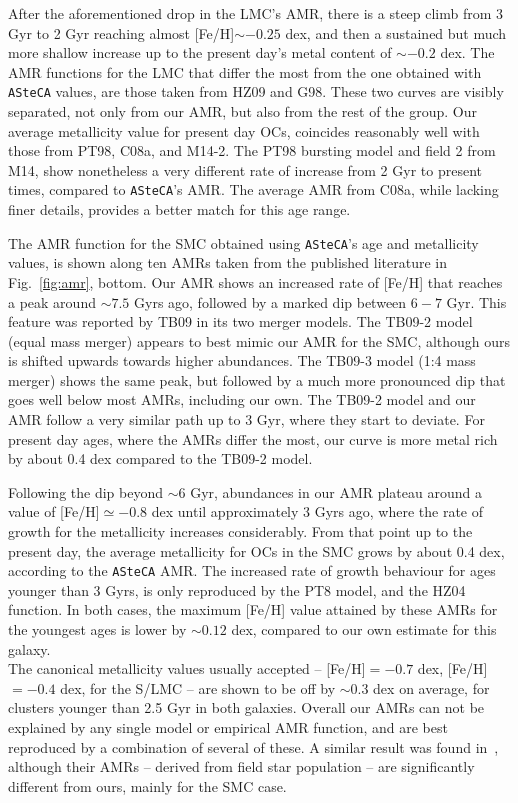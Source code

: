 \documentclass[a4paper,fleqn,usenatbib]{mnras}
\begin{document}
%
After the aforementioned drop in the LMC's AMR, there is a steep climb from 3
Gyr to 2 Gyr reaching almost [Fe/H]${\sim-}0.25$ dex, and then a sustained but
much more shallow increase up to the present day's metal content of ${\sim-}0.2$
dex. The AMR functions for the LMC that differ the most from the one obtained
with \texttt{ASteCA} values, are those taken from HZ09 and G98. These two curves
are visibly separated, not only from our AMR, but also from the rest of the
group.
Our average metallicity value for present day OCs, coincides reasonably well
with those from PT98, C08a, and M14-2. The PT98 bursting model and field 2
from M14, show nonetheless a very different rate of increase from 2 Gyr to
present times, compared to \texttt{ASteCA}'s AMR. The average AMR from C08a,
while lacking finer details, provides a better match for this age range.

%
The AMR function for the SMC obtained using \texttt{ASteCA}'s age and
metallicity values, is shown along ten AMRs taken from the published literature
in Fig.~\ref{fig:amr}, bottom.
%
Our AMR shows an increased rate of [Fe/H] that reaches a peak around
${\sim}7.5$ Gyrs ago, followed by a marked dip between $6{-}7$ Gyr.
This feature was reported by TB09 in its two merger models.
The TB09-2 model (equal mass merger) appears to best mimic our AMR for the SMC,
although ours is shifted upwards towards higher abundances. The TB09-3 model 
(1:4 mass merger) shows the same peak, but followed by a much more pronounced
dip that goes well below most AMRs, including our own.
%
The TB09-2 model and our AMR follow a very similar path up to 3 Gyr,
where they start to deviate. For present day ages, where the AMRs differ the
most, our curve is more metal rich by about 0.4 dex compared to the TB09-2
model.

Following the dip beyond ${\sim}6$ Gyr, abundances in our AMR plateau around a
value of [Fe/H]${\simeq-}0.8$ dex until approximately 3 Gyrs ago, where the
rate of growth for the metallicity increases considerably. From that point up to
the present day, the average metallicity for OCs in the SMC grows by about 0.4
dex, according to the \texttt{ASteCA} AMR.
%
The increased rate of growth behaviour for ages younger than 3 Gyrs, is only
reproduced by the PT8 model, and the HZ04 function. In both cases, the maximum 
[Fe/H] value attained by these AMRs for the youngest ages is lower by
${\sim}0.12$ dex, compared to our own estimate for this galaxy.\\

%
The canonical metallicity values usually accepted -- [Fe/H]${=-0.7}$ dex,
[Fe/H]${=-}0.4$ dex, for the S/LMC -- are shown to be off by ${\sim0.3}$ dex on
average, for clusters younger than 2.5 Gyr in both galaxies.
%
Overall our AMRs can not be explained by any single model or empirical AMR
function, and are best reproduced by a combination of several of these. A
similar result was found in~\cite{Piatti_Geisler_2013}, although their AMRs --
derived from field star population -- are significantly different from ours,
mainly for the SMC case.
\end{document}
